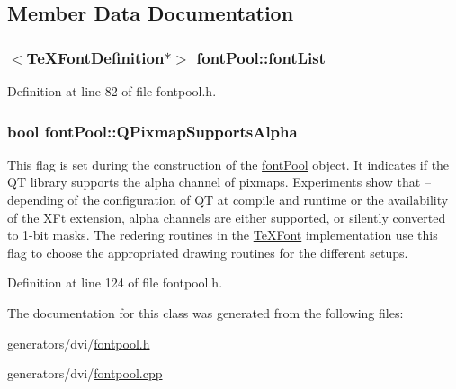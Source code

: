 \subsection{Member Data Documentation}
\hypertarget{classfontPool_a6a4a93e8193b31519eb5e17c623c65ac}{
\subsubsection[{font\+List}]{$<${\bf Te\+X\+Font\+Definition}$\ast$$>$ font\+Pool\+::font\+List}}\label{classfontPool_a6a4a93e8193b31519eb5e17c623c65ac}


Definition at line 82 of file fontpool.\+h.

\hypertarget{classfontPool_af02ca5badcfd15a93f871606867909b7}{
\subsubsection[{Q\+Pixmap\+Supports\+Alpha}]{\setlength{\rightskip}{0pt plus 5cm}bool font\+Pool\+::\+Q\+Pixmap\+Supports\+Alpha}}\label{classfontPool_af02ca5badcfd15a93f871606867909b7}
This flag is set during the construction of the \hyperlink{classfontPool}{font\+Pool} object. It indicates if the Q\+T library supports the alpha channel of pixmaps. Experiments show that --depending of the configuration of Q\+T at compile and runtime or the availability of the X\+Ft extension, alpha channels are either supported, or silently converted to 1-\/bit masks. The redering routines in the \hyperlink{classTeXFont}{Te\+X\+Font} implementation use this flag to choose the appropriated drawing routines for the different setups. 

Definition at line 124 of file fontpool.\+h.



The documentation for this class was generated from the following files\+:\begin{DoxyCompactItemize}
\item 
generators/dvi/\hyperlink{fontpool_8h}{fontpool.\+h}\item 
generators/dvi/\hyperlink{fontpool_8cpp}{fontpool.\+cpp}\end{DoxyCompactItemize}
